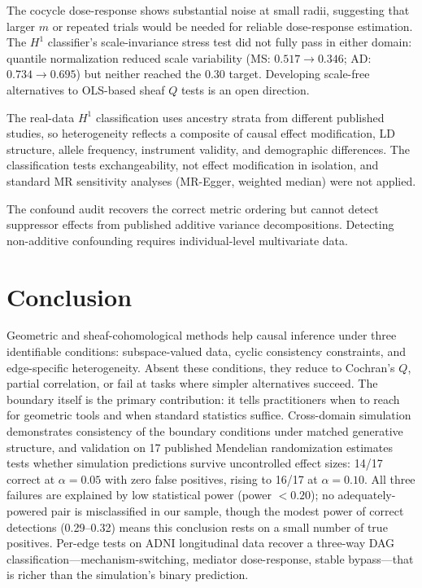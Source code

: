 \documentclass{article}
\begin{document}
The cocycle dose-response shows substantial noise at small radii, suggesting that larger $m$ or repeated trials would be needed for reliable dose-response estimation.
The $H^1$ classifier's scale-invariance stress test did not fully pass in either domain: quantile normalization reduced scale variability (MS: $0.517 \to 0.346$; AD: $0.734 \to 0.695$) but neither reached the $0.30$ target.
Developing scale-free alternatives to OLS-based sheaf $Q$ tests is an open direction.

The real-data $H^1$ classification uses ancestry strata from different published studies, so heterogeneity reflects a composite of causal effect modification, LD structure, allele frequency, instrument validity, and demographic differences.
The classification tests exchangeability, not effect modification in isolation, and standard MR sensitivity analyses (MR-Egger, weighted median) were not applied.

The confound audit recovers the correct metric ordering but cannot detect suppressor effects from published additive variance decompositions.
Detecting non-additive confounding requires individual-level multivariate data.

\section{Conclusion}
\label{sec:conclusion}

Geometric and sheaf-cohomological methods help causal inference under three identifiable conditions: subspace-valued data, cyclic consistency constraints, and edge-specific heterogeneity.
Absent these conditions, they reduce to Cochran's $Q$, partial correlation, or fail at tasks where simpler alternatives succeed.
The boundary itself is the primary contribution: it tells practitioners when to reach for geometric tools and when standard statistics suffice.
Cross-domain simulation demonstrates consistency of the boundary conditions under matched generative structure, and validation on 17 published Mendelian randomization estimates tests whether simulation predictions survive uncontrolled effect sizes: 14/17 correct at $\alpha = 0.05$ with zero false positives, rising to 16/17 at $\alpha = 0.10$.
All three failures are explained by low statistical power (power $< 0.20$); no adequately-powered pair is misclassified in our sample, though the modest power of correct detections (0.29--0.32) means this conclusion rests on a small number of true positives.
Per-edge tests on ADNI longitudinal data recover a three-way DAG classification---mechanism-switching, mediator dose-response, stable bypass---that is richer than the simulation's binary prediction.
\end{document}
